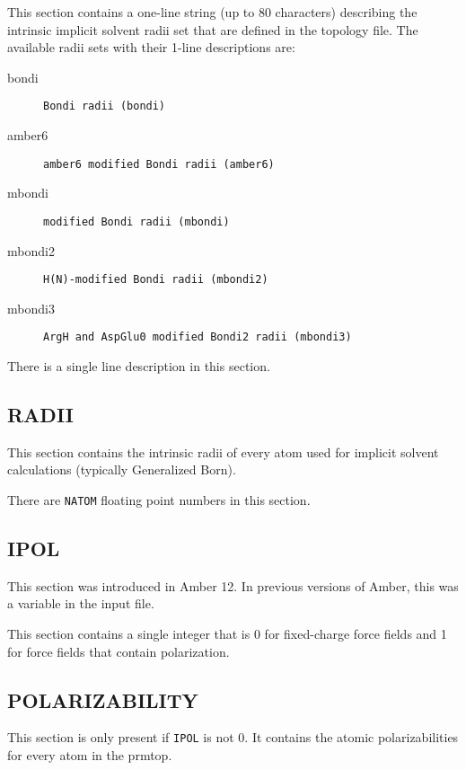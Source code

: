 This section contains a one-line string (up to 80 characters) describing the
intrinsic implicit solvent radii set that are defined in the topology file. The
available radii sets with their 1-line descriptions are:
\begin{description}
   \item[bondi] {\tt Bondi radii (bondi)}
   \item[amber6] {\tt amber6 modified Bondi radii (amber6)}
   \item[mbondi] {\tt modified Bondi radii (mbondi)}
   \item[mbondi2] {\tt H(N)-modified Bondi radii (mbondi2)}
   \item[mbondi3] {\tt ArgH and AspGlu0 modified Bondi2 radii (mbondi3)}
\end{description}


\noindent There is a single line description in this section.

\subsection*{RADII}

This section contains the intrinsic radii of every atom used for implicit
solvent calculations (typically Generalized Born).


\noindent There are {\tt NATOM} floating point numbers in this section.

\subsection*{IPOL}

This section was introduced in Amber 12. In previous versions of Amber, this was
a variable in the input file.

This section contains a single integer that is 0 for fixed-charge force fields
and 1 for force fields that contain polarization.

\subsection*{POLARIZABILITY}

This section is only present if {\tt IPOL} is not 0. It contains the atomic
polarizabilities for every atom in the prmtop.


